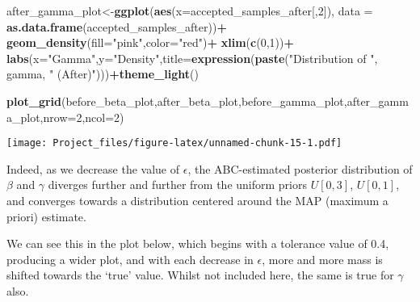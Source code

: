 \documentclass[
]{article}
\newenvironment{Shaded}{\begin{snugshade}}{\end{snugshade}}
\newcommand{\AttributeTok}[1]{\textcolor[rgb]{0.13,0.29,0.53}{#1}}
\newcommand{\DecValTok}[1]{\textcolor[rgb]{0.00,0.00,0.81}{#1}}
\newcommand{\FunctionTok}[1]{\textcolor[rgb]{0.13,0.29,0.53}{\textbf{#1}}}
\newcommand{\NormalTok}[1]{#1}
\newcommand{\OtherTok}[1]{\textcolor[rgb]{0.56,0.35,0.01}{#1}}
\newcommand{\SpecialCharTok}[1]{\textcolor[rgb]{0.81,0.36,0.00}{\textbf{#1}}}
\newcommand{\StringTok}[1]{\textcolor[rgb]{0.31,0.60,0.02}{#1}}
\begin{document}
\begin{Shaded}
\begin{Highlighting}[]
\NormalTok{after\_gamma\_plot}\OtherTok{\textless{}{-}}\FunctionTok{ggplot}\NormalTok{(}\FunctionTok{aes}\NormalTok{(}\AttributeTok{x=}\NormalTok{accepted\_samples\_after[,}\DecValTok{2}\NormalTok{]), }\AttributeTok{data =} \FunctionTok{as.data.frame}\NormalTok{(accepted\_samples\_after))}\SpecialCharTok{+}
  \FunctionTok{geom\_density}\NormalTok{(}\AttributeTok{fill=}\StringTok{"pink"}\NormalTok{,}\AttributeTok{color=}\StringTok{"red"}\NormalTok{)}\SpecialCharTok{+}
  \FunctionTok{xlim}\NormalTok{(}\FunctionTok{c}\NormalTok{(}\DecValTok{0}\NormalTok{,}\DecValTok{1}\NormalTok{))}\SpecialCharTok{+}
  \FunctionTok{labs}\NormalTok{(}\AttributeTok{x=}\StringTok{"Gamma"}\NormalTok{,}\AttributeTok{y=}\StringTok{"Density"}\NormalTok{,}\AttributeTok{title=}\FunctionTok{expression}\NormalTok{(}\FunctionTok{paste}\NormalTok{(}\StringTok{"Distribution of "}\NormalTok{, gamma, }\StringTok{" (After)"}\NormalTok{)))}\SpecialCharTok{+}\FunctionTok{theme\_light}\NormalTok{()}

\FunctionTok{plot\_grid}\NormalTok{(before\_beta\_plot,after\_beta\_plot,before\_gamma\_plot,after\_gamma\_plot,}\AttributeTok{nrow=}\DecValTok{2}\NormalTok{,}\AttributeTok{ncol=}\DecValTok{2}\NormalTok{)}
\end{Highlighting}
\end{Shaded}

\texttt{[image: Project\_files/figure-latex/unnamed-chunk-15-1.pdf]}

Indeed, as we decrease the value of \(\epsilon\), the ABC-estimated
posterior distribution of \(\beta\) and \(\gamma\) diverges further and
further from the uniform priors \(U[0,3]\), \(U[0,1]\), and converges
towards a distribution centered around the MAP (maximum a priori)
estimate.

We can see this in the plot below, which begins with a tolerance value
of 0.4, producing a wider plot, and with each decrease in \(\epsilon\),
more and more mass is shifted towards the `true' value. Whilst not
included here, the same is true for \(\gamma\) also.
\end{document}
